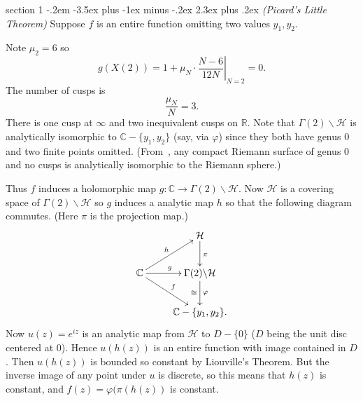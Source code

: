 \documentclass[12pt]{article}
\makeatletter
\theoremstyle{norm}
\newcommand{\C}[0]{\mathbb{C}}
\newcommand{\R}[0]{\mathbb{R}}
\providecommand{\cal}[1]{\mathcal{#1}}
\renewcommand{\cal}[1]{\mathcal{#1}}
\newcommand{\Ga}[0]{\Gamma}
\newcommand{\la}[0]{\lambda}
\newcommand{\ph}[0]{\varphi}
\newcommand{\om}[0]{\omega}
\newcommand{\pa}[1]{\left( {#1} \right)}
\newcommand{\bs}[0]{\backslash}
\newenvironment{problem}{\@startsection
       {section}
       {1}
       {-.2em}
       {-3.5ex plus -1ex minus -.2ex}
       {2.3ex plus .2ex}
       {\pagebreak[3]%
       \large\bf\noindent{Problem }
       }
       }
       {%
       }
\makeatother
\begin{document}
\begin{problem} {\it (Picard's Little Theorem)}
Suppose $f$ is an entire function omitting two values $y_1,y_2$.

Note $\mu_2=6$ so
\[
g(X(2))=\left.1+\mu_N\cdot \frac{N-6}{12N}\right|_{N=2}=0.
\]
The number of cusps is
\[
\frac{\mu_N}{N}=3.
\]
There is one cusp at $\infty$ and two inequivalent cusps on $\R$.
Note that $\Ga(2)\bs \cal H$ is analytically isomorphic to $\C-\{y_1,y_2\}$ (say, via $\ph$) since they both have genus 0 and two finite points omitted.%
(From~\cite{mir}, any compact Riemann surface of genus 0 and no cusps is analytically isomorphic to the Riemann sphere.)

Thus $f$ induces a holomorphic map $g: \C\to \Ga(2)\bs \cal H$.
Now $\cal H$ is a covering space of $\Ga(2)\bs \cal H$ so $g$ induces a analytic map $h$ so that the following diagram commutes. (Here $\pi$ is the projection map.)
\[
\xymatrix{
&\cal H\ar^{\pi}[d]\\
\C\ar^{g}[r]\ar^{h}[ru]\ar^{f}[rd]& \Ga(2)\bs \cal H\ar^{\ph}_{\cong}[d]\\ &\C-\{y_1,y_2\}.
}
\]
Now $u(z)=e^{iz}$ is an analytic map from $\cal H$ to $D-\{0\}$ ($D$ being the unit disc centered at 0). Hence $u(h(z))$ is an entire function with image contained in $D$. Then $u(h(z))$ is bounded so constant by Liouville's Theorem. But the inverse image of any point under $u$ is discrete, so this means that $h(z)$ is constant, and $f(z)=\ph(\pi(h(z))$ is constant.
\end{problem}
\end{document}
